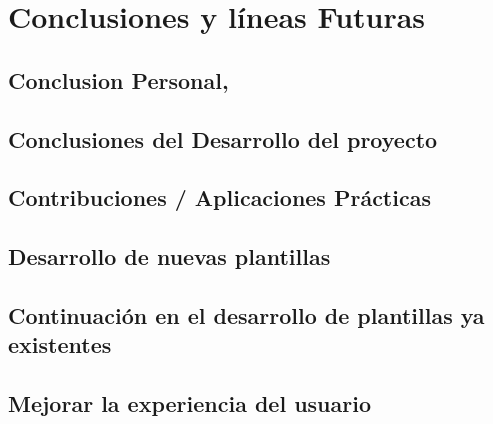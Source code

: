 \documentclass[12pt, a4paper, twoside]{article}
\begin{document}
\section{Conclusiones y líneas Futuras }
\subsection{Conclusion Personal,}
\subsection{Conclusiones del Desarrollo del proyecto}
\subsection{Contribuciones / Aplicaciones Prácticas}
\subsection{Desarrollo de nuevas plantillas }
\subsection{Continuación en el desarrollo de plantillas ya existentes}
\subsection{Mejorar la experiencia del usuario }








\end{document}
